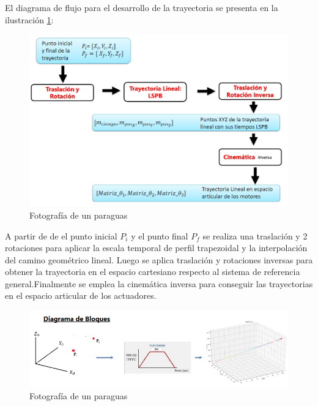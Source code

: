     \newpage
        
    El diagrama de flujo para el desarrollo de la trayectoria se presenta en la ilustración \ref{f:cap6_trayectory_4}:
    
     \begin{figure}[htb]
            \centering
            \includegraphics[width=1\linewidth]{Main/Chapter6/Images6/cap6_trayectory_4.png}
            \caption{Fotografía de un paraguas}
            \label{f:cap6_trayectory_4}
        \end{figure}
        
    A partir de de el punto inicial $P_i$ y el punto final $P_f$ se realiza una traslación y 2 rotaciones para aplicar la escala temporal de perfil trapezoidal y la interpolación del camino geométrico lineal. Luego se aplica traslación y rotaciones inversas para obtener la trayectoria en el espacio cartesiano respecto al sistema de referencia general.Finalmente se emplea la cinemática inversa para conseguir las trayectorias en el espacio articular de los actuadores.     
    
         \begin{figure}[htb]
            \centering
            \includegraphics[width=0.9\linewidth]{Main/Chapter6/Images6/cap6_trayectory_1.png}
            \caption{Fotografía de un paraguas}
            \label{f:cap6_trayectory_5}
        \end{figure}    
    \newpage
    
